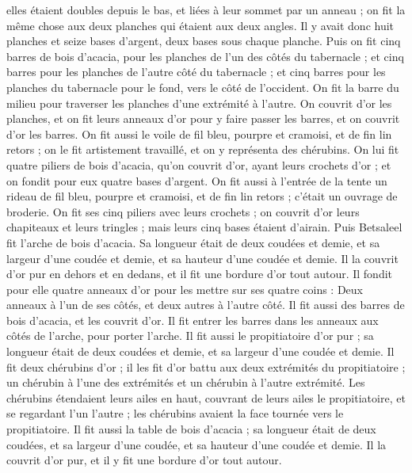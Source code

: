 \begin{multicols}{2}
elles étaient doubles depuis le bas, et liées à leur sommet par un anneau ; on fit la même chose aux deux planches qui étaient aux deux angles.
Il y avait donc huit planches et seize bases d'argent, deux bases sous chaque planche.
Puis on fit cinq barres de bois d’acacia, pour les planches de l'un des côtés du tabernacle ;
et cinq barres pour les planches de l'autre côté du tabernacle ; et cinq barres pour les planches du tabernacle pour le fond, vers le côté de l'occident.
On fit la barre du milieu pour traverser les planches d’une extrémité à l’autre.
On couvrit d'or les planches, et on fit leurs anneaux d'or pour y faire passer les barres, et on couvrit d'or les barres.
On fit aussi le voile de fil bleu, pourpre et cramoisi, et de fin lin retors ; on le fit artistement travaillé, et on y représenta des chérubins.
On lui fit quatre piliers de bois d’acacia, qu'on couvrit d'or, ayant leurs crochets d'or ; et on fondit pour eux quatre bases d'argent.
On fit aussi à l'entrée de la tente un rideau de fil bleu, pourpre et cramoisi, et de fin lin retors ; c’était un ouvrage de broderie.
On fit ses cinq piliers avec leurs crochets ; on couvrit d'or leurs chapiteaux et leurs tringles ; mais leurs cinq bases étaient d'airain.
\VerseOne{}Puis Betsaleel fit l'arche de bois d’acacia. Sa longueur était de deux coudées et demie, et sa largeur d'une coudée et demie, et sa hauteur d'une coudée et demie.
Il la couvrit d’or pur en dehors et en dedans, et il fit une bordure d'or tout autour.
Il fondit pour elle quatre anneaux d'or pour les mettre sur ses quatre coins : Deux anneaux à l'un de ses côtés, et deux autres à l'autre côté.
Il fit aussi des barres de bois d’acacia, et les couvrit d'or.
Il fit entrer les barres dans les anneaux aux côtés de l'arche, pour porter l'arche.
Il fit aussi le propitiatoire d’or pur ; sa longueur était de deux coudées et demie, et sa largeur d'une coudée et demie.
Il fit deux chérubins d'or ; il les fit d’or battu aux deux extrémités du propitiatoire ;
un chérubin à l’une des extrémités et un chérubin à l’autre extrémité.
Les chérubins étendaient leurs ailes en haut, couvrant de leurs ailes le propitiatoire, et se regardant l’un l’autre ; les chérubins avaient la face tournée vers le propitiatoire.
Il fit aussi la table de bois d’acacia ; sa longueur était de deux coudées, et sa largeur d'une coudée, et sa hauteur d'une coudée et demie.
Il la couvrit d’or pur, et il y fit une bordure d’or tout autour.

\end{multicols}
